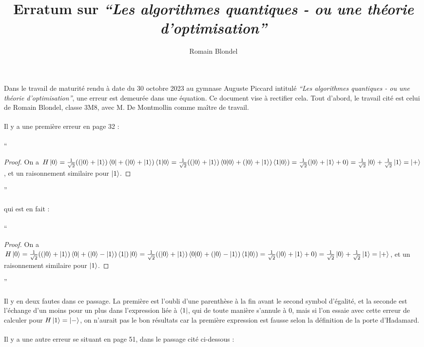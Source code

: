 \documentclass[11pt,a4paper]{article}
\author{Romain Blondel}
\title{\textbf{Erratum} sur \emph{``Les algorithmes quantiques - ou une théorie d'optimisation''}}
\begin{document}
\maketitle
Dans le travail de maturité rendu à date du 30 octobre 2023 au gymnase Auguste Piccard intitulé \emph{``Les algorithmes quantiques - ou une théorie d'optimisation''}, une erreur est demeurée dans une équation. Ce document vise à rectifier cela. Tout d'abord, le travail cité est celui de Romain Blondel, classe 3M8, avec M. De Montmollin comme maître de travail.\\ \\
Il y a une première erreur en page 32 :\\ \\
``\begin{proof}
    On a $H \ket{0} = \frac{1}{\sqrt{2}} ((\ket{0}+\ket{1})\bra{0} + (\ket{0}+\ket{1})\bra{1} \ket{0} =
    \frac{1}{\sqrt{2}} ((\ket{0}+\ket{1})\bra{0}\ket{0} + (\ket{0}+\ket{1})\bra{1}\ket{0}) =
    \frac{1}{\sqrt{2}} (\ket{0}+\ket{1} + 0) = \frac{1}{\sqrt{2}} \ket{0} + \frac{1}{\sqrt{2}} \ket{1} =
    \ket{+}$, et un raisonnement similaire pour $\ket{1}$.
\end{proof}''\\ \\
qui est en fait :\\ \\
``\begin{proof}
    On a $H \ket{0} = \frac{1}{\sqrt{2}} ((\ket{0}+\ket{1})\bra{0} + (\ket{0}-\ket{1})\bra{1}) \ket{0} =
    \frac{1}{\sqrt{2}} ((\ket{0}+\ket{1})\bra{0}\ket{0} + (\ket{0}-\ket{1})\bra{1}\ket{0}) =
    \frac{1}{\sqrt{2}} (\ket{0}+\ket{1} + 0) = \frac{1}{\sqrt{2}} \ket{0} + \frac{1}{\sqrt{2}} \ket{1} =
    \ket{+}$, et un raisonnement similaire pour $\ket{1}$.
\end{proof}''\\ \\
Il y en deux fautes dans ce passage. La première est l'oubli d'une parenthèse à la fin avant le second symbol d'égalité, et la seconde est l'échange d'un moins pour un plus dans l'expression liée à $\bra{1}$, qui de toute manière s'annule à 0, mais si l'on essaie avec cette erreur de calculer pour $H \ket{1} = \ket{-}$, on n'aurait pas le bon résultats car la première expression est fausse selon la définition de la porte d'Hadamard.\\ \\
\clearpage
Il y a une autre erreur se situant en page 51, dans le passage cité ci-dessous :\\ \\
\end{document}
